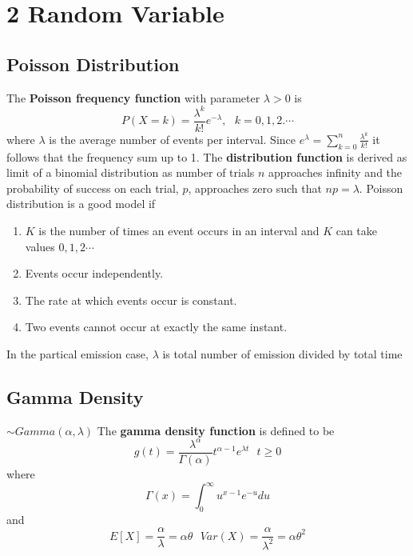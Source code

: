 \documentclass[11pt]{article}
\begin{document}
\section*{2 Random Variable}


\subsection*{Poisson Distribution}

\begin{defn*}
  The \textbf{Poisson frequency function} with parameter $\lambda > 0$ is
  \[
    P(X = k) =\frac{\lambda^k}{k!}e^{-\lambda}, \text{         } k = 0,1,2.\cdots
  \]
  where $\lambda$ is the average number of events per interval. Since $e^{\lambda} = \sum_{k=0}^n \frac{\lambda^k}{k!}$ it follows that the frequency sum up to 1. The \textbf{distribution function} is derived as limit of a binomial distribution as number of trials $n$ approaches infinity and the probability of success on each trial, $p$, approaches zero such that $np =\lambda$. Poisson distribution is a good model if
  \begin{enumerate}
    \item $K$ is the number of times an event occurs in an interval and $K$ can take values $0, 1, 2\cdots$
    \item Events occur independently.
    \item The rate at which events occur is constant.
    \item Two events cannot occur at exactly the same instant.
  \end{enumerate}
  \begin{rem}
    In the partical emission case, $\lambda$ is total number of emission divided by total time
  \end{rem}
\end{defn*}


\subsection*{Gamma Density}

\begin{defn*}
  $\sim Gamma(\alpha, \lambda)$ The \textbf{gamma density function} is defined to be
  \[
    g(t) = \frac{\lambda^{\alpha}}{\Gamma(\alpha)} t^{\alpha-1}e^{\lambda t} \text{      } t \geq 0
  \]
  where
  \[
    \Gamma(x) = \int_0^{\infty} u^{x-1}e^{-u}du
  \]
  and
  \[
    E[X] = \frac{\alpha}{\lambda} = \alpha\theta \text{    } Var(X) = \frac{\alpha}{\lambda^2} = \alpha\theta^2
  \]
\end{defn*}
\end{document}
